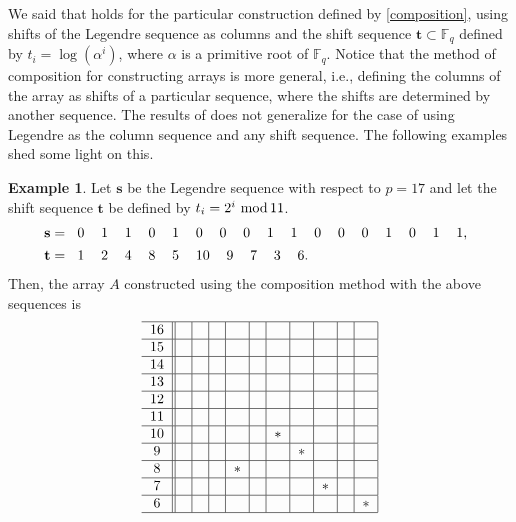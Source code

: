 \documentclass[12pt]{article}
\renewcommand{\mod}{\ \textup{mod}\,}
\theoremstyle{definition}
\theoremstyle{definition}
\theoremstyle{definition}
\newtheorem{example}[theorem]{Example}
\theoremstyle{plain}
\theoremstyle{plain}
\numberwithin{equation}{section}
\begin{document}
We said that  holds for the particular construction defined by \cref{composition}, using shifts of the Legendre sequence as columns and the shift sequence $\mathbf{t} \subset \mathbb{F}_q$ defined by $t_i = \log (\alpha^i)$, where $\alpha$ is a primitive root of $\mathbb{F}_q$.
Notice that the method of composition for constructing arrays is more general, i.e., defining the columns of the array as shifts of a particular sequence, where the shifts are determined by another sequence.
The results of  does not generalize for the case of using Legendre as the column sequence and any shift sequence.
The following examples shed some light on this.
\begin{example}
    Let $\mathbf{s}$ be the Legendre sequence with respect to $p=17$ and let the shift sequence $\mathbf{t}$ be defined by $t_i = 2^i \mod 11$. 
    \setcounter{MaxMatrixCols}{20}
    \begin{align*}
        \mathbf{s} &= \begin{tabular}{ccccccccccccccccc}
        0 & 1 & 1 & 0 & 1 & 0 & 0 & 0 & 1 & 1 & 0 & 0 & 0 & 1 & 0 & 1 & 1,
        \end{tabular}\\
        \mathbf{t} &= \begin{tabular}{cccccccccc}
        1 & 2 & 4 & 8 & 5 & 10 & 9 & 7 & 3 & 6.
        \end{tabular}
    \end{align*}
    Then, the array $A$ constructed using the composition method with the above sequences is
    \[
        \begin{tabular}{c ||c|c|c|c|c|c|c|c|c|c|} \hline     
        16 & & & & & & & & & & \\ \hline
        15 & & & & & & & & & & \\\hline
        14 & & & & & & & & & & \\\hline
        13 & & & & & & & & & & \\\hline
        12 & & & & & & & & & & \\\hline
        11 & & & & & & & & & & \\\hline
        10 & & & & & & $*$ & & & & \\\hline
        9 & & & & & & & $*$ & & & \\\hline
        8 & & & & $*$ & & & & & & \\\hline
        7 & & & & & & & & $*$ & & \\\hline
        6 & & & & & & & & & & $*$ \\\hline

\end{tabular}\]
\end{example}
\end{document}
